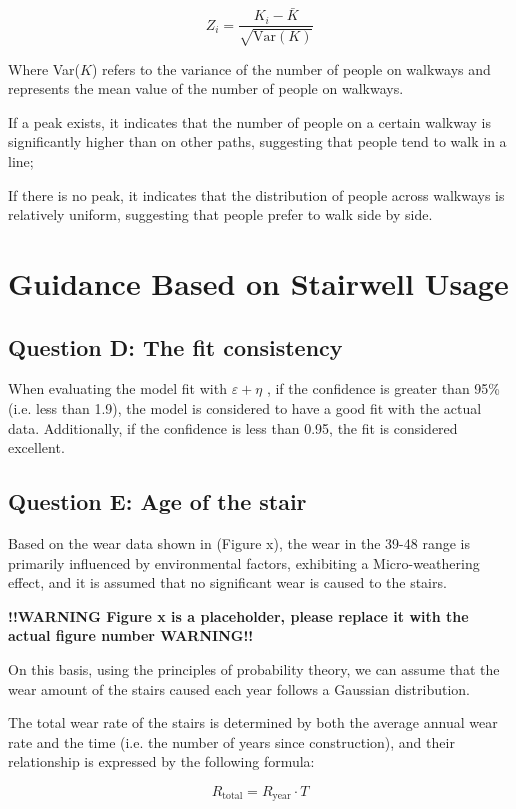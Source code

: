 \documentclass{mcmthesis}
\begin{document}
\[ Z_i = \frac{K_i - \bar{K}}{\sqrt{\text{Var}(K)}} \]

Where Var($K$) refers to the variance of the number of people on walkways and represents the mean value of the number of people on walkways.



If a peak exists, it indicates that the number of people on a certain walkway is significantly higher than on other paths, suggesting that people tend to walk in a line;

If there is no peak, it indicates that the distribution of people across walkways is relatively uniform, suggesting that people prefer to walk side by side.

\section{Guidance Based on Stairwell Usage}
\subsection{Question D: The fit consistency}
When evaluating the model fit with $\varepsilon +\eta$ , if the confidence is greater than 95\% (i.e. less than 1.9), the model is considered to have a good fit with the actual data. Additionally, if the confidence is less than 0.95, the fit is considered excellent.
\subsection{Question E: Age of the stair }

Based on the wear data shown in (Figure x), the wear in the 39-48 range is primarily influenced by environmental factors, exhibiting a Micro-weathering effect, and it is assumed that no significant wear is caused to the stairs.

\textbf{!!WARNING Figure x is a placeholder, please replace it with the actual figure number WARNING!!}

On this basis, using the principles of probability theory, we can assume that the wear amount of the stairs caused each year follows a Gaussian distribution.

The total wear rate of the stairs is determined by both the average annual wear rate and the time (i.e. the number of years since construction), and their relationship is expressed by the following formula:

\[R_{\text{total}} = R_{\text{year}} \cdot T \]
\end{document}
